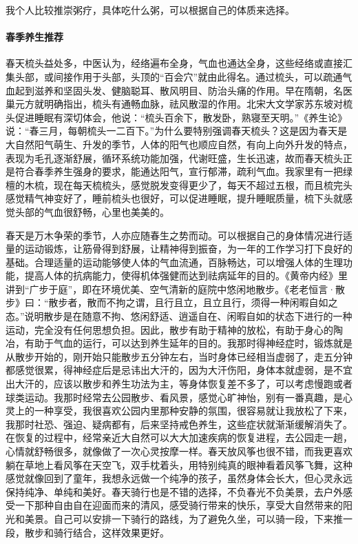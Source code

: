 我个人比较推崇粥疗，具体吃什么粥，可以根据自己的体质来选择。

\paragraph{春季养生推荐}

春天梳头益处多，中医认为，经络遍布全身，气血也通达全身，这些经络或直接汇集头部，或间接作用于头部，头顶的“百会穴”就由此得名。通过梳头，可以疏通气血起到滋养和坚固头发、健脑聪耳、散风明目、防治头痛的作用。早在隋朝，名医巢元方就明确指出，梳头有通畅血脉，祛风散湿的作用。北宋大文学家苏东坡对梳头促进睡眠有深切体会，他说：“梳头百余下，散发卧，熟寝至天明。”《养生论》说：“春三月，每朝梳头一二百下。”为什么要特别强调春天梳头？这是因为春天是大自然阳气萌生、升发的季节，人体的阳气也顺应自然，有向上向外升发的特点，表现为毛孔逐渐舒展，循环系统功能加强，代谢旺盛，生长迅速，故而春天梳头正是符合春季养生强身的要求，能通达阳气，宣行郁滞，疏利气血。我家里有一把绿檀的木梳，现在每天梳梳头，感觉脱发变得更少了，每天不超过五根，而且梳完头感觉精气神变好了，睡前梳头也很好，可以促进睡眠，提升睡眠质量，梳下头就感觉头部的气血很舒畅，心里也美美的。

春天是万木争荣的季节，人亦应随春生之势而动。可以根据自己的身体情况进行适量的运动锻炼，让筋骨得到舒展，让精神得到振奋，为一年的工作学习打下良好的基础。合理适量的运动能够使人体的气血流通，百脉畅达，可以增强人体的生理功能，提高人体的抗病能力，使得机体强健而达到祛病延年的目的。《黄帝内经》里讲到“广步于庭”，即在环境优美、空气清新的庭院中悠闲地散步。《老老恒言·散步》曰：“散步者，散而不拘之谓，且行且立，且立且行，须得一种闲暇自如之态。”说明散步是在随意不拘、悠闲舒适、逍遥自在、闲暇自如的状态下进行的一种运动，完全没有任何思想负担。因此，散步有助于精神的放松，有助于身心的陶冶，有助于气血的运行，可以达到养生延年的目的。我那时得神经症时，锻炼就是从散步开始的，刚开始只能散步五分钟左右，当时身体已经相当虚弱了，走五分钟都感觉很累，得神经症后是忌讳出大汗的，因为大汗伤阳，身体本就虚弱，是不宜出大汗的，应该以散步和养生功法为主，等身体恢复差不多了，可以考虑慢跑或者球类运动。我那时经常去公园散步、看风景，感觉心旷神怡，别有一番真趣，是心灵上的一种享受，我很喜欢公园内里那种安静的氛围，很容易就让我放松了下来，我那时社恐、强迫、疑病都有，后来坚持戒色养生，这些症状就渐渐缓解消失了。在恢复的过程中，经常亲近大自然可以大大加速疾病的恢复进程，去公园走一趟，心情就舒畅很多，就像做了一次心灵按摩一样。春天放风筝也很不错，而我更喜欢躺在草地上看风筝在天空飞，双手枕着头，用特别纯真的眼神看着风筝飞舞，这种感觉就像回到了童年，我想永远做一个纯净的孩子，虽然身体会长大，但心灵永远保持纯净、单纯和美好。春天骑行也是不错的选择，不负春光不负美景，去户外感受一下那种自由自在迎面而来的清风，感受骑行带来的快乐，享受大自然带来的阳光和美景。自己可以安排一下骑行的路线，为了避免久坐，可以骑一段，下来推一段，散步和骑行结合，这样效果更好。

